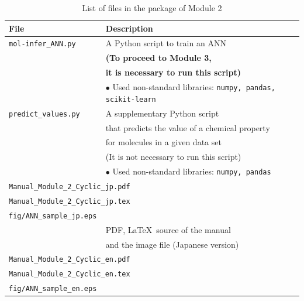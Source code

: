 \documentclass[11pt,titlepage,dvipdfmx,twoside]{book}
\begin{document}
\begin{table}[h!]
  \centering
  \caption{List of files in the package of Module 2}
  \label{tab:files}
  \begin{tabular}{lcll}
  \hline
  \bf File &\ \ & \multicolumn{2}{l}{\bf Description}\\
  \hline
  \verb|mol-infer_ANN.py| && \multicolumn{2}{l}{A Python script to train an ANN}\\
  &&\multicolumn{2}{l}{\bf (To proceed to Module 3,}\\
  &&\multicolumn{2}{l}{\bf it is necessary to run this script)}\\
  &&\multicolumn{2}{l}{$\bullet$ Used non-standard libraries: {\tt numpy, pandas, scikit-learn}}\\
  \hline
  \verb|predict_values.py| && \multicolumn{2}{l}{A supplementary Python script}\\
  &&\multicolumn{2}{l}{that predicts the value of a chemical property}\\
  &&\multicolumn{2}{l}{for molecules in a given data set}\\
  &&\multicolumn{2}{l}{(It is not necessary to run this script)}\\
  &&\multicolumn{2}{l}{$\bullet$ Used non-standard libraries: {\tt numpy, pandas}}\\
  \hline
  \multicolumn{4}{l}{\tt Manual\_Module\_2\_Cyclic\_jp.pdf}\\
  \multicolumn{4}{l}{\tt Manual\_Module\_2\_Cyclic\_jp.tex}\\
  \multicolumn{4}{l}{\tt fig/ANN\_sample\_jp.eps}\\
  &&\multicolumn{2}{l}{PDF, \LaTeX\  source of the manual}\\
  &&\multicolumn{2}{l}{and the image file (Japanese version)}\\
  \hline
  \multicolumn{4}{l}{\tt Manual\_Module\_2\_Cyclic\_en.pdf}\\
  \multicolumn{4}{l}{\tt Manual\_Module\_2\_Cyclic\_en.tex}\\
  \multicolumn{4}{l}{\tt fig/ANN\_sample\_en.eps}\\

\end{tabular}
\end{table}
\end{document}
